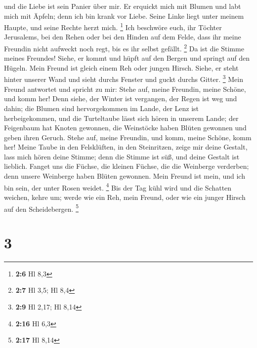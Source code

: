 und die Liebe ist sein Panier über mir.  Er erquickt mich
mit Blumen und labt mich mit Äpfeln; denn ich bin krank vor Liebe.
 Seine Linke liegt unter meinem Haupte, und seine Rechte
herzt mich. \footnote{\textbf{2:6} Hl 8,3}  Ich beschwöre
euch, ihr Töchter Jerusalems, bei den Rehen oder bei den Hinden auf dem
Felde, dass ihr meine Freundin nicht aufweckt noch regt, bis es ihr
selbst gefällt. \footnote{\textbf{2:7} Hl 3,5; Hl 8,4}  Da
ist die Stimme meines Freundes! Siehe, er kommt und hüpft auf den Bergen
und springt auf den Hügeln.  Mein Freund ist gleich einem
Reh oder jungen Hirsch. Siehe, er steht hinter unserer Wand und sieht
durchs Fenster und guckt durchs Gitter. \footnote{\textbf{2:9} Hl 2,17;
  Hl 8,14}  Mein Freund antwortet und spricht zu mir:
Stehe auf, meine Freundin, meine Schöne, und komm her! 
Denn siehe, der Winter ist vergangen, der Regen ist weg und dahin;
 die Blumen sind hervorgekommen im Lande, der Lenz ist
herbeigekommen, und die Turteltaube lässt sich hören in unserem Lande;
 der Feigenbaum hat Knoten gewonnen, die Weinstöcke haben
Blüten gewonnen und geben ihren Geruch. Stehe auf, meine Freundin, und
komm, meine Schöne, komm her!  Meine Taube in den
Felsklüften, in den Steinritzen, zeige mir deine Gestalt, lass mich
hören deine Stimme; denn die Stimme ist süß, und deine Gestalt ist
lieblich.  Fanget uns die Füchse, die kleinen Füchse, die
die Weinberge verderben; denn unsere Weinberge haben Blüten gewonnen.
 Mein Freund ist mein, und ich bin sein, der unter Rosen
weidet. \footnote{\textbf{2:16} Hl 6,3}  Bis der Tag kühl
wird und die Schatten weichen, kehre um; werde wie ein Reh, mein Freund,
oder wie ein junger Hirsch auf den Scheidebergen. \footnote{\textbf{2:17}
  Hl 8,14}

\hypertarget{section-1}{%
\section{3}\label{section-1}}

